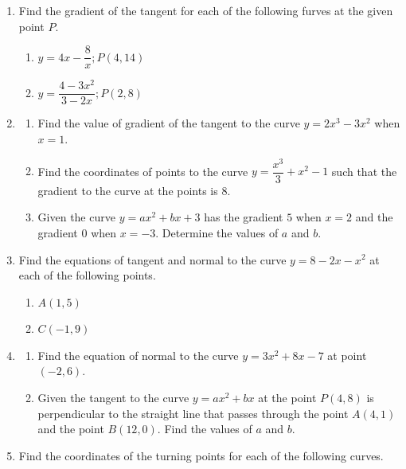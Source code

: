 \documentclass{report}
\begin{document}
\begin{multicols*}{2}
\begin{enumerate}
        \item Find the gradient of the tangent for each of the following furves at the given
              point $P$.
              \begin{enumerate}
                  \item $y = 4x - \dfrac{8}{x}; P(4, 14)$
                  \item $y = \dfrac{4 - 3x^2}{3-2x}; P(2, 8)$
              \end{enumerate}
        \item \begin{enumerate}
                  \item Find the value of gradient of the tangent to the curve $y = 2x^3 - 3x^2$ when
                        $x = 1$.
                  \item Find the coordinates of points to the curve $y = \dfrac{x^3}{3} + x^2 - 1$ such
                        that the gradient to the curve at the points is $8$.
                  \item Given the curve $y = ax^2 + bx + 3$ has the gradient $5$ when $x = 2$ and the
                        gradient $0$ when $x = -3$. Determine the values of $a$ and $b$.
              \end{enumerate}
        \item Find the equations of tangent and normal to the curve $y = 8 - 2x - x^2$ at
              each of the following points.
              \begin{enumerate}
                  \item $A(1, 5)$
                  \item $C(-1, 9)$
              \end{enumerate}
        \item \begin{enumerate}
                  \item Find the equation of normal to the curve $y = 3x^2 + 8x - 7$ at point $(-2,
                            6)$.
                  \item Given the tangent to the curve $y = ax^2 + bx$ at the point $P(4, 8)$ is
                        perpendicular to the straight line that passes through the point $A(4, 1)$ and
                        the point $B(12, 0)$. Find the values of $a$ and $b$.
              \end{enumerate}
        \item Find the coordinates of the turning points for each of the following curves.
              \begin{enumerate}

\end{enumerate}
\end{enumerate}
\end{multicols*}
\end{document}
